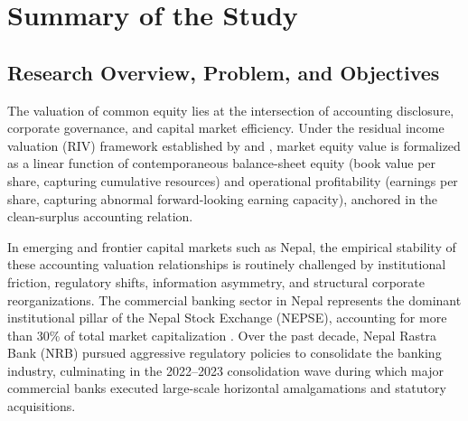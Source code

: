 \section{Summary of the Study}

\subsection{Research Overview, Problem, and Objectives}
The valuation of common equity lies at the intersection of accounting disclosure, corporate governance, and capital market efficiency. Under the residual income valuation (RIV) framework established by \citet{ohlson1995} and \citet{feltham1995}, market equity value is formalized as a linear function of contemporaneous balance-sheet equity (book value per share, capturing cumulative resources) and operational profitability (earnings per share, capturing abnormal forward-looking earning capacity), anchored in the clean-surplus accounting relation.

In emerging and frontier capital markets such as Nepal, the empirical stability of these accounting valuation relationships is routinely challenged by institutional friction, regulatory shifts, information asymmetry, and structural corporate reorganizations. The commercial banking sector in Nepal represents the dominant institutional pillar of the Nepal Stock Exchange (NEPSE), accounting for more than 30\% of total market capitalization \citep{gurungdahal2025}. Over the past decade, Nepal Rastra Bank (NRB) pursued aggressive regulatory policies to consolidate the banking industry, culminating in the 2022--2023 consolidation wave during which major commercial banks executed large-scale horizontal amalgamations and statutory acquisitions.

